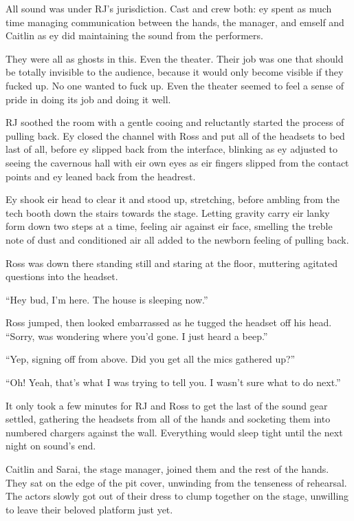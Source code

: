 All sound was under RJ's jurisdiction. Cast and crew both: ey spent as much time managing communication between the hands, the manager, and emself and Caitlin as ey did maintaining the sound from the performers.

They were all as ghosts in this. Even the theater. Their job was one that should be totally invisible to the audience, because it would only become visible if they fucked up. No one wanted to fuck up. Even the theater seemed to feel a sense of pride in doing its job and doing it well.

RJ soothed the room with a gentle cooing and reluctantly started the process of pulling back. Ey closed the channel with Ross and put all of the headsets to bed last of all, before ey slipped back from the interface, blinking as ey adjusted to seeing the cavernous hall with eir own eyes as eir fingers slipped from the contact points and ey leaned back from the headrest.

Ey shook eir head to clear it and stood up, stretching, before ambling from the tech booth down the stairs towards the stage. Letting gravity carry eir lanky form down two steps at a time, feeling air against eir face, smelling the treble note of dust and conditioned air all added to the newborn feeling of pulling back.

Ross was down there standing still and staring at the floor, muttering agitated questions into the headset.

``Hey bud, I'm here. The house is sleeping now.''

Ross jumped, then looked embarrassed as he tugged the headset off his head. ``Sorry, was wondering where you'd gone. I just heard a beep.''

``Yep, signing off from above. Did you get all the mics gathered up?''

``Oh! Yeah, that's what I was trying to tell you. I wasn't sure what to do next.''

It only took a few minutes for RJ and Ross to get the last of the sound gear settled, gathering the headsets from all of the hands and socketing them into numbered chargers against the wall. Everything would sleep tight until the next night on sound's end.

Caitlin and Sarai, the stage manager, joined them and the rest of the hands. They sat on the edge of the pit cover, unwinding from the tenseness of rehearsal. The actors slowly got out of their dress to clump together on the stage, unwilling to leave their beloved platform just yet.

